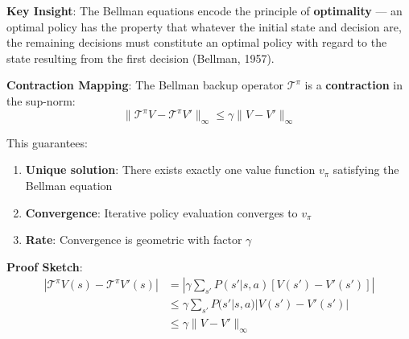 \documentclass[11pt,a4paper]{article}
\begin{document}
\begin{center}
\end{center}

\begin{tcolorbox}[colback=yellow!5!white,colframe=yellow!75!black,title=\textbf{Bellman Equations: Theoretical Foundations}]
\textbf{Key Insight}: The Bellman equations encode the principle of \textbf{optimality} --- an optimal policy has the property that whatever the initial state and decision are, the remaining decisions must constitute an optimal policy with regard to the state resulting from the first decision (Bellman, 1957).

\textbf{Contraction Mapping}: The Bellman backup operator $\mathcal{T}^\pi$ is a \textbf{contraction} in the sup-norm:
\[
\|\mathcal{T}^\pi V - \mathcal{T}^\pi V'\|_\infty \leq \gamma \|V - V'\|_\infty
\]

This guarantees:
\begin{enumerate}
    \item \textbf{Unique solution}: There exists exactly one value function $v_\pi$ satisfying the Bellman equation
    \item \textbf{Convergence}: Iterative policy evaluation converges to $v_\pi$
    \item \textbf{Rate}: Convergence is geometric with factor $\gamma$
\end{enumerate}

\textbf{Proof Sketch}:
\begin{align}
    |\mathcal{T}^\pi V(s) - \mathcal{T}^\pi V'(s)| &= \left|\gamma \sum_{s'} P(s'|s,a) [V(s') - V'(s')]\right| \\
    &\leq \gamma \sum_{s'} P(s'|s,a) |V(s') - V'(s')| \\
    &\leq \gamma \|V - V'\|_\infty
\end{align}
\end{tcolorbox}
\end{document}
